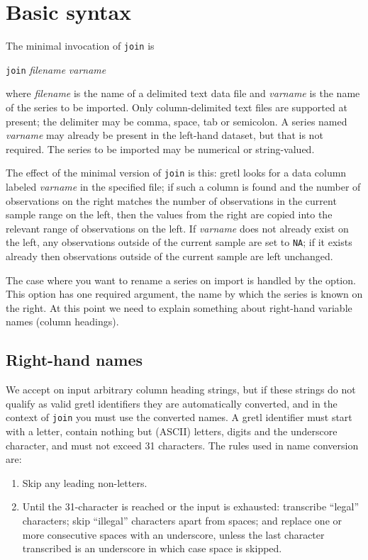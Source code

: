 \section{Basic syntax}
\label{sec:join-syntax}

The minimal invocation of \texttt{join} is

\qquad \texttt{join} \textsl{filename} \textsl{varname}

where \textsl{filename} is the name of a delimited text data file and
\textsl{varname} is the name of the series to be imported. Only
column-delimited text files are supported at present; the delimiter
may be comma, space, tab or semicolon. A series named \textsl{varname}
may already be present in the left-hand dataset, but that is not
required. The series to be imported may be numerical or string-valued.

The effect of the minimal version of \texttt{join} is this: gretl
looks for a data column labeled \textsl{varname} in the specified
file; if such a column is found and the number of observations on the
right matches the number of observations in the current sample range
on the left, then the values from the right are copied into the
relevant range of observations on the left. If \textsl{varname} does
not already exist on the left, any observations outside of the current
sample are set to \texttt{NA}; if it exists already then observations
outside of the current sample are left unchanged.

The case where you want to rename a series on import is handled by the
 option. This option has one required argument, the name
by which the series is known on the right. At this point we need to
explain something about right-hand variable names (column
headings). 

\subsection{Right-hand names}

We accept on input arbitrary column heading strings, but if these
strings do not qualify as valid gretl identifiers they are
automatically converted, and in the context of \texttt{join} you must
use the converted names. A gretl identifier must start with a letter,
contain nothing but (ASCII) letters, digits and the underscore
character, and must not exceed 31 characters. The rules used in name
conversion are:

\begin{enumerate}
\item Skip any leading non-letters.
\item Until the 31-character is reached or the input is exhausted:
  transcribe ``legal'' characters; skip ``illegal'' characters apart
  from spaces; and replace one or more consecutive spaces with an
  underscore, unless the last character transcribed is an underscore
  in which case space is skipped.
\end{enumerate}


